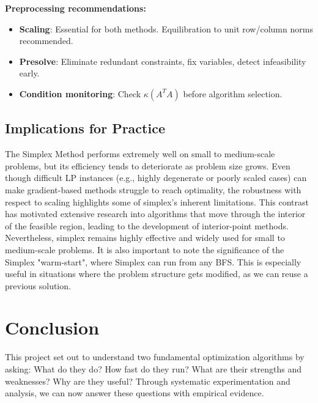 \documentclass[11pt]{article}
\begin{document}
\textbf{Preprocessing recommendations:}
\begin{itemize}
    \item \textbf{Scaling}: Essential for both methods. Equilibration to unit row/column norms recommended.
    \item \textbf{Presolve}: Eliminate redundant constraints, fix variables, detect infeasibility early.
    \item \textbf{Condition monitoring}: Check \(\kappa(A^TA)\) before algorithm selection.
\end{itemize}

\subsection{Implications for Practice}

The Simplex Method performs extremely well on small to medium-scale problems, but its efficiency tends to deteriorate as problem size grows. Even though difficult LP instances (e.g., highly degenerate or poorly scaled cases) can make gradient-based methods struggle to reach optimality, the robustness with respect to scaling highlights some of simplex’s inherent limitations. This contrast has motivated extensive research into algorithms that move through the interior of the feasible region, leading to the development of interior-point methods. Nevertheless, simplex remains highly effective and widely used for small to medium-scale problems. It is also important to note the significance of the Simplex "warm-start", where Simplex can run from any BFS. This is especially useful in situations where the problem structure gets modified, as we can reuse a previous solution.


\section{Conclusion}

This project set out to understand two fundamental optimization algorithms by asking: What do they do? How fast do they run? What are their strengths and weaknesses? Why are they useful? Through systematic experimentation and analysis, we can now answer these questions with empirical evidence.
\end{document}
